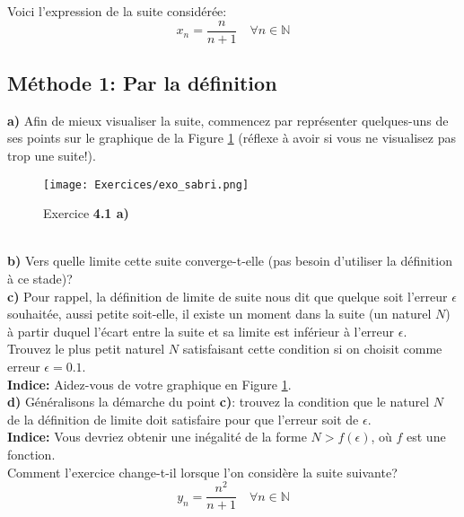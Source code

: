 \documentclass[a4paper, 12pt, french, twoside]{article}
\newcommand{\Nn}{{\mathbb{N}}}
\begin{document}
Voici l'expression de la suite considérée:
\begin{equation}
    x_n = \frac{n}{n+1} \quad \forall n\in \Nn
    \label{exo_suite_limite}
\end{equation}

\subsection{Méthode 1: Par la définition}
\textbf{a)} Afin de mieux visualiser la suite, commencez par représenter quelques-uns de ses points sur le graphique de la Figure \ref{fig:exo4.1a} (réflexe à avoir si vous ne visualisez pas trop une suite!). \\

\begin{figure}[H]
    \centering
    \texttt{[image: Exercices/exo\_sabri.png]}
    \caption{Exercice \textbf{4.1 a)}}
    \label{fig:exo4.1a}
\end{figure}\\

\textbf{b)} Vers quelle limite cette suite converge-t-elle (pas besoin d'utiliser la définition à ce stade)? \\

\textbf{c)} Pour rappel, la définition de limite de suite nous dit que quelque soit l'erreur $\epsilon$ souhaitée, aussi petite soit-elle, il existe un moment dans la suite (un naturel $N$) à partir duquel l'écart entre la suite et sa limite est inférieur à l'erreur $\epsilon$.\\ 
Trouvez le plus petit naturel $N$ satisfaisant cette condition si on choisit comme erreur $\epsilon = 0.1$. \\ \textbf{Indice:} Aidez-vous de votre graphique en Figure \ref{fig:exo4.1a}.\\

\textbf{d)} Généralisons la démarche du point \textbf{c)}: trouvez la condition que le naturel $N$ de la définition de limite doit satisfaire pour que l'erreur soit de $\epsilon$.\\
\textbf{Indice:} Vous devriez obtenir une inégalité de la forme $N > f(\epsilon)$, où $f$ est une fonction.\\

\faLightbulbO \quad {} Comment l'exercice change-t-il lorsque l'on considère la suite suivante?
\begin{equation}
    y_n = \frac{n^2}{n+1} \quad \forall n\in \Nn
\end{equation}
\end{document}
